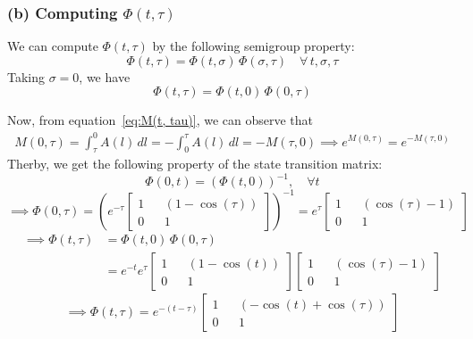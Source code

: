 \clearpage
\subsubsection*{(b) Computing \( \Phi(t, \tau) \)}

We can compute \( \Phi(t, \tau) \) by the following semigroup property:
\begin{equation}\label{eq:semigroup}
    \Phi(t, \tau)
    =
    \Phi(t, \sigma) \, \Phi(\sigma, \tau)
    \quad
    \forall \, t, \sigma, \tau
\end{equation}
Taking \( \sigma = 0 \), we have
\begin{equation*}
    \Phi(t, \tau)
    =
    \Phi(t, 0) \, \Phi(0, \tau)
\end{equation*}

Now, from equation~\eqref{eq:M(t, tau)}, we can observe that
\begin{align*}
    M(0, \tau)
    =
    \int_{\tau}^{0} A(l) \, dl
    =
    -\int_{0}^{\tau} A(l) \, dl
    =
    - M(\tau, 0)
    \implies
    e^{M(0, \tau)}
    =
    e^{-M(\tau, 0)}
\end{align*}
Therby, we get the following property of the state transition matrix:
\begin{equation*}
    \Phi(0, t)
    =
    {(\Phi(t, 0))}^{-1},
    \quad
    \forall t
\end{equation*}
\begin{equation*}
    \implies
    \Phi(0, \tau)
    =
    {\left(
    e^{-\tau}
    \begin{bmatrix}
        1
         &  &
        (1 - \cos(\tau))
        \\
        0
         &  &
        1
    \end{bmatrix}
    \right)}^{-1}
    =
    e^{\tau}
    \begin{bmatrix}
        1
         &  &
        (\cos(\tau) - 1)
        \\
        0
         &  &
        1
    \end{bmatrix}
\end{equation*}
\begin{align*}
    \implies
    \Phi(t, \tau)
     & =
    \Phi(t, 0) \, \Phi(0, \tau)
    \\ & =
    e^{-t} e^{\tau}
    \begin{bmatrix}
        1
         &  &
        (1 - \cos(t))
        \\
        0
         &  &
        1
    \end{bmatrix}
    \begin{bmatrix}
        1
         &  &
        (\cos(\tau) - 1)
        \\
        0
         &  &
        1
    \end{bmatrix}
\end{align*}
\begin{equation*}
    \implies
    \boxed{
        \Phi(t, \tau)
        =
        e^{-(t - \tau)}
        \begin{bmatrix}
            1
             &  &
            (-\cos(t) + \cos(\tau))
            \\
            0
             &  &
            1
        \end{bmatrix}
    }
\end{equation*}
